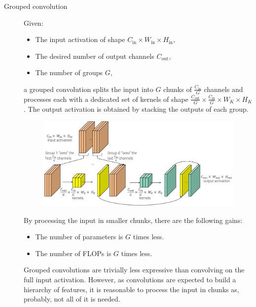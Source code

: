 \begin{description}
    \item[Grouped convolution] 
        Given:
        \begin{itemize}
            \item The input activation of shape $C_\text{in} \times W_\text{in} \times H_\text{in}$,\item The desired number of output channels $C_\text{out}$,
            \item The number of groups $G$,
        \end{itemize} 
        a grouped convolution splits the input into $G$ chunks of $\frac{C_\text{in}}{G}$ channels and processes each with a dedicated set of kernels of shape $\frac{C_\text{out}}{G} \times \frac{C_\text{in}}{G} \times W_K \times H_K$. The output activation is obtained by stacking the outputs of each group.

        \begin{figure}[H]
            \centering
            \includegraphics[width=0.7\linewidth]{./img/_grouped_conv.jpg}
        \end{figure}

        By processing the input in smaller chunks, there are the following gains:
        \begin{itemize}
            \item The number of parameters is $G$ times less.
            \item The number of FLOPs is $G$ times less.
        \end{itemize}

        \begin{remark}
            Grouped convolutions are trivially less expressive than convolving on the full input activation. However, as convolutions are expected to build a hierarchy of features, it is reasonable to process the input in chunks as, probably, not all of it is needed.
        \end{remark}
\end{description}

